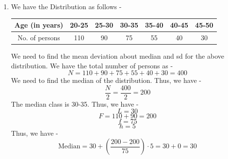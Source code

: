\begin{enumerate}
    We know that -
    \[(x_i - \mu)^2 \geq 0\]
    Thus, we have -
    \[(\mu - 36 - \mu)^2 \leq \sum (x_i - \mu)^2\]
    \[\Rightarrow 1296 \leq 10 \sigma^2\]
    \[\Rightarrow \sigma^2 \geq 129.6\]
    \[\Rightarrow \sigma \geq \sqrt{129.6} = 10.8\]
    Thus, we have shown that the sd of IQ for all children cannot be less than 10.8. 
    Now, we need to find the sd without the dull boy.
    We have the formula for standard deviation as -
    \[\sigma = \sqrt{\frac{\sum (x_i - \mu)^2}{N}}\]
    where $x_i$ are the observations, $N$ is the number of observations and $\mu$ is the mean. \\
    We have the mean after removing the dull boy as - 
    $$\mu' = \frac{10\mu - (\mu - 36)}{9} = \frac{9\mu + 36}{9} = \mu + 4$$
    We have the sum of squares after removing the dull boy as -
    \[\sum (x_i - \mu')^2 = \sum (x_i - \mu + \mu - \mu')^2\]
    \[= \sum (x_i - \mu - 4)^2 = \sum (x_i - \mu)^2 - 8 \sum (x_i - \mu) + 16N\]
    \[= \sum (x_i - \mu)^2 + 16N\]
    \[= 10 \sigma^2 + 160 \quad \text{(2)}\]
    Thus, we have the sd without the dull boy as -
    \[\sigma' = \sqrt{\frac{\sum (x_i - \mu')^2}{N - 1}} = \sqrt{\frac{10 \sigma^2 + 160}{9}}\]
    Given that $\sigma = 11.4$, we have -
    \[\sigma' = \sqrt{\frac{10 \cdot (11.4)^2 + 160}{9}} = \sqrt{\frac{10 \cdot 129.96 + 160}{9}} = \sqrt{\frac{1299.6 + 160}{9}} = \sqrt{\frac{1459.6}{9}} \approx \sqrt{162.18} \approx 12.74\]
    \[\boxed{\sigma' \approx 12.74
    }\]
    \item We have the Distribution as follows -
    \begin{center}
        \begin{tabular}{|c|cccccc|}
            \hline 
            Age (in years) & 20-25 & 25-30 & 30-35 & 35-40 & 40-45 & 45-50 \\
            \hline
            No. of persons & 110 & 90 & 75 & 55 & 40 & 30 \\
            \hline
        \end{tabular}
    \end{center}
    We need to find the mean deviation about median and sd for the above distribution.
    We have the total number of persons as -
    \[N = 110 + 90 + 75 + 55 + 40 + 30 = 400\]
    We need to find the median of the distribution. Thus, we have -
    \[\frac{N}{2} = \frac{400}{2} = 200\]
    The median class is 30-35. Thus, we have -
    \[L = 30\]
    \[F = 110 + 90 = 200\]
    \[f = 75\]
    \[h = 5\]
    Thus, we have -
    \[ \text{Median} = 30 + \left(\frac{200 - 200}{75}\right) \cdot 5 = 30 + 0 = 30\]

\end{enumerate}
